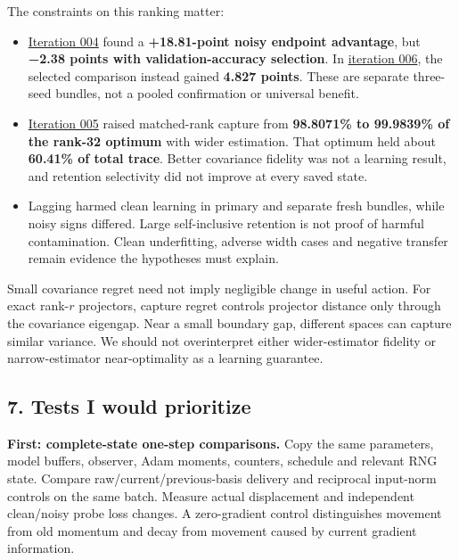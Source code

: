 \documentclass[
  british,
  10pt,
  a4paper,
]{article}
\providecommand{\tightlist}{%
  \setlength{\itemsep}{0pt}\setlength{\parskip}{0pt}}
\begin{document}
The constraints on this ranking matter:

\begin{itemize}
\tightlist
\item
  \href{../continuation/iteration-004/results.md}{Iteration 004} found a
  \textbf{+18.\allowbreak{}81-\allowbreak{}point noisy endpoint
  advantage}, but \textbf{−2.38 points with
  validation-\allowbreak{}accuracy selection}. In
  \href{../continuation/iteration-006/results.md}{iteration 006}, the
  selected comparison instead gained \textbf{4.827 points}. These are
  separate three-seed bundles, not a pooled confirmation or universal
  benefit.
\item
  \href{../continuation/iteration-005/results.md}{Iteration 005} raised
  matched-\allowbreak{}rank capture from \textbf{98.8071\% to 99.9839\%
  of the rank-32 optimum} with wider estimation.\allowbreak{} That
  optimum held about \textbf{60.41\% of total trace}. Better covariance
  fidelity was not a learning result, and retention selectivity did not
  improve at every saved state.
\item
  Lagging harmed clean learning in primary and separate fresh bundles,
  while noisy signs differed. Large self-\allowbreak{}inclusive
  retention is not proof of harmful
  contaminatio\allowbreak{}n.\allowbreak{} Clean
  underfitting\allowbreak{},\allowbreak{} adverse width cases and
  negative transfer remain evidence the hypotheses must explain.
\end{itemize}

Small covariance regret need not imply negligible change in useful
action. For exact rank-\(r\) projectors,\allowbreak{} capture regret
controls projector distance only through the covariance eigengap. Near a
small boundary gap, different spaces can capture similar variance. We
should not overinterpret either wider-\allowbreak{}estimator fidelity or
narrow-\allowbreak{}estimator near-\allowbreak{}optimality as a learning
guarantee.

\subsection{7. Tests I would
prioritize}\label{mathematics--tests-i-would-prioritize}

\textbf{First: complete-\allowbreak{}state one-step
comparisons.\allowbreak{}} Copy the same parameters,\allowbreak{} model
buffers, observer, Adam moments, counters, schedule and relevant RNG
state. Compare
raw/\allowbreak{}current/\allowbreak{}previous-\allowbreak{}basis
delivery and reciprocal input-norm controls on the same batch. Measure
actual displacement and independent clean/\allowbreak{}noisy probe loss
changes. A zero-\allowbreak{}gradient control distinguishes movement
from old momentum and decay from movement caused by current gradient
information.\allowbreak{}
\end{document}
